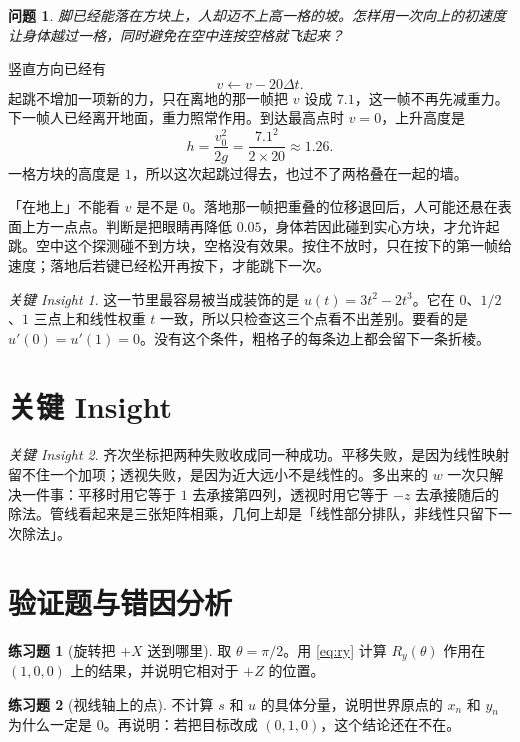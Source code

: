 \documentclass[12pt,a4paper]{article}
\theoremstyle{definition}
\newtheorem{exercise}{练习题}
\theoremstyle{plain}
\newtheorem{problem}{问题}[section]
\theoremstyle{remark}
\newtheorem*{insight}{关键 Insight}
\begin{document}
\begin{problem}
脚已经能落在方块上，人却迈不上高一格的坡。怎样用一次向上的初速度让身体越过一格，同时避免在空中连按空格就飞起来？
\end{problem}

竖直方向已经有
\[
v\leftarrow v-20\Delta t.
\]
起跳不增加一项新的力，只在离地的那一帧把 \(v\) 设成 \(7.1\)，这一帧不再先减重力。下一帧人已经离开地面，重力照常作用。到达最高点时 \(v=0\)，上升高度是
\[
h=\frac{v_0^2}{2g}=\frac{7.1^2}{2\times 20}\approx 1.26.
\]
一格方块的高度是 \(1\)，所以这次起跳过得去，也过不了两格叠在一起的墙。

「在地上」不能看 \(v\) 是不是 \(0\)。落地那一帧把重叠的位移退回后，人可能还悬在表面上方一点点。判断是把眼睛再降低 \(0.05\)，身体若因此碰到实心方块，才允许起跳。空中这个探测碰不到方块，空格没有效果。按住不放时，只在按下的第一帧给速度；落地后若键已经松开再按下，才能跳下一次。

\begin{insight}
这一节里最容易被当成装饰的是 \(u(t)=3t^2-2t^3\)。它在 \(0\)、\(1/2\)、\(1\) 三点上和线性权重 \(t\) 一致，所以只检查这三个点看不出差别。要看的是 \(u'(0)=u'(1)=0\)。没有这个条件，粗格子的每条边上都会留下一条折棱。
\end{insight}

\section{关键 Insight}

\begin{insight}
齐次坐标把两种失败收成同一种成功。平移失败，是因为线性映射留不住一个加项；透视失败，是因为近大远小不是线性的。多出来的 $w$ 一次只解决一件事：平移时用它等于 $1$ 去承接第四列，透视时用它等于 $-z$ 去承接随后的除法。管线看起来是三张矩阵相乘，几何上却是「线性部分排队，非线性只留下一次除法」。
\end{insight}

\section{验证题与错因分析}

\begin{exercise}[旋转把 $+X$ 送到哪里]
取 $\theta=\pi/2$。用 \eqref{eq:ry} 计算 $R_y(\theta)$ 作用在 $(1,0,0)$ 上的结果，并说明它相对于 $+Z$ 的位置。
\end{exercise}

\begin{exercise}[视线轴上的点]
不计算 $s$ 和 $u$ 的具体分量，说明世界原点的 $x_n$ 和 $y_n$ 为什么一定是 $0$。再说明：若把目标改成 $(0,1,0)$，这个结论还在不在。
\end{exercise}
\end{document}

